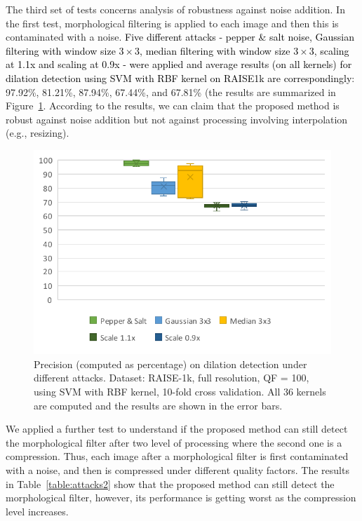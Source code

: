 \documentclass{ieeeaccess}
\newcommand{\revisedtext}[1]{\textcolor{black}{#1}}
\begin{document}
The third set of tests concerns analysis of robustness against noise addition. In the first test, morphological filtering is applied to each image and then this is contaminated with a noise. \revisedtext{Five different attacks - pepper \& salt noise, Gaussian filtering with window size $3 \times 3$, median filtering with window size $3 \times 3$, scaling at 1.1x and scaling at 0.9x - were applied and average results (on all kernels) for dilation detection using SVM with RBF kernel on RAISE1k are correspondingly}: 97.92\%, 81.21\%, 87.94\%, 67.44\%, and 67.81\% (the results are summarized in Figure~\ref{fig:attacks_1}. According to the results, we can claim that the proposed method is robust against noise addition but not against processing involving interpolation (e.g., resizing). 

\begin{figure}[t!]
	\centering
	\includegraphics[width=\linewidth]{attacks_1.pdf}
	\caption{Precision (computed as percentage) on dilation detection under different attacks. Dataset: RAISE-1k, full resolution, QF = 100, using SVM with RBF kernel, 10-fold cross validation. All 36 kernels are computed and the results are shown in the error bars.}
	\label{fig:attacks_1}
\end{figure}

We applied a further test to understand if the proposed method can still detect the morphological filter after two level of processing where the second one is a compression. Thus, each image after a morphological filter is first contaminated with a noise, and then is compressed under different quality factors.  The results in Table~\ref{table:attacks2} show that the proposed method can still detect the morphological filter, however, its performance is getting worst as the compression level increases.  
\end{document}
